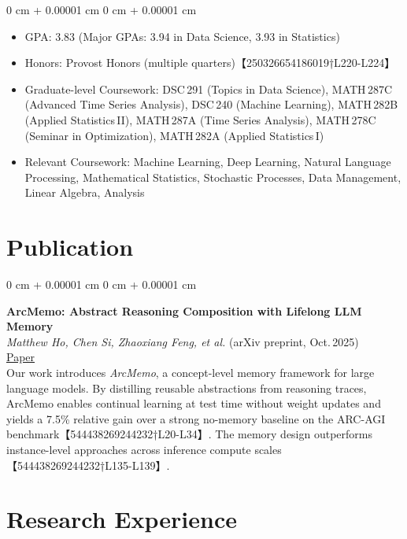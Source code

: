 \documentclass[10pt, letterpaper]{article}
\newenvironment{highlights}{
    \begin{itemize}[
        topsep=0.10 cm,
        parsep=0.10 cm,
        partopsep=0pt,
        itemsep=0pt,
        leftmargin=0 cm + 10pt
    ]
}{
    \end{itemize}
} %
\newenvironment{onecolentry}{
    \begin{adjustwidth}{
        0 cm + 0.00001 cm
    }{
        0 cm + 0.00001 cm
    }
}{
    \end{adjustwidth}
} %
\begin{document}
    \vspace{0.10 cm}
    \begin{onecolentry}
        \begin{highlights}
            \item GPA: 3.83 (Major GPAs: 3.94 in Data Science, 3.93 in Statistics)
            \item Honors: Provost Honors (multiple quarters)【250326654186019†L220-L224】
            \item Graduate-level Coursework: DSC\,291 (Topics in Data Science), MATH\,287C (Advanced Time Series Analysis), DSC\,240 (Machine Learning), MATH\,282B (Applied Statistics\,II), MATH\,287A (Time Series Analysis), MATH\,278C (Seminar in Optimization), MATH\,282A (Applied Statistics\,I)
            \item Relevant Coursework: Machine Learning, Deep Learning, Natural Language Processing, Mathematical Statistics, Stochastic Processes, Data Management, Linear Algebra, Analysis
        \end{highlights}
    \end{onecolentry}

    \section{Publication}

    \begin{onecolentry}
        \textbf{ArcMemo: Abstract Reasoning Composition with Lifelong LLM Memory} \\
        \textit{Matthew Ho, Chen Si, Zhaoxiang Feng, et al.} (arXiv preprint, Oct.\@\,2025) \\
        \href{https://arxiv.org/abs/2509.04439}{Paper} \\
        Our work introduces \emph{ArcMemo}, a concept-level memory framework for large language models. By distilling reusable abstractions from reasoning traces, ArcMemo enables continual learning at test time without weight updates and yields a 7.5\% relative gain over a strong no-memory baseline on the ARC-AGI benchmark【544438269244232†L20-L34】. The memory design outperforms instance-level approaches across inference compute scales【544438269244232†L135-L139】.
    \end{onecolentry}

    \section{Research Experience}
\end{document}
